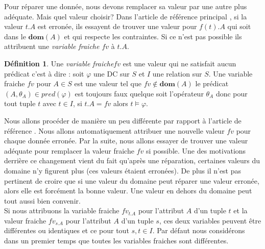 \documentclass[letterpaper, 12pt]{report}
\theoremstyle{definition}
\newtheorem{mydef}{Définition}
\newcommand{\dom}{\mathbf{dom}}
\begin{document}
Pour réparer une donnée, nous devons remplacer sa valeur par une autre plus adéquate. Mais quel valeur choisir? Dans l'article de référence principal \cite{main}, si la valeur $t.A$ est erronée, ils essayent de trouver une valeur pour $f(t).A$ qui soit dans le $\dom (A)$ et qui respecte les contraintes. Si ce n'est pas possible ils attribuent une \emph{variable fraiche $fv$} à $t.A$. \\

\begin{mydef}
Une \emph{variable fraiche}$fv$ est une valeur qui ne satisfait aucun prédicat c'est à dire : soit $\varphi$ une DC sur $S$ et $I$ une relation sur $S$. Une variable fraiche $fv$ pour $A \in S$ est une valeur tel que $fv \not\in \dom(A)$ le prédicat $(A,\theta_A) \in pred(\varphi)$ est toujours faux quelque soit l'opérateur $\theta_A$ donc pour tout tuple $t$ avec $t \in I$, si $t.A = fv$ alors $t \models \varphi$.
\end{mydef}

Nous allons procéder de manière un peu différente par rapport à l'article de référence \cite{main}. Nous allons automatiquement attribuer une nouvelle valeur $fv$ pour chaque donnée erronée. Par la suite, nous allons essayer de trouver une valeur adéquate pour remplacer la valeur fraiche $fv$ si possible. Une des motivations derrière ce changement vient du fait qu'après une réparation, certaines valeurs du domaine n'y figurent plus (ces valeurs étaient erronées). De plus il n'est pas pertinent de croire que si une valeur du domaine peut réparer une valeur erronée, alors elle est forcément la bonne valeur. Une valeur en dehors du domaine peut tout aussi bien convenir.\\

Si nous attribuons la variable fraiche $fv_{t.A}$ pour l'attribut $A$ d'un tuple $t$ et la valeur fraiche $fv_{s.A}$ pour l'attribut $A$ d'un tuple $s$, ces deux variables peuvent être différentes ou identiques et ce pour tout $s,t \in I$. Par défaut nous considérons dans un premier temps que toutes les variables fraiches sont différentes.\\
\end{document}

